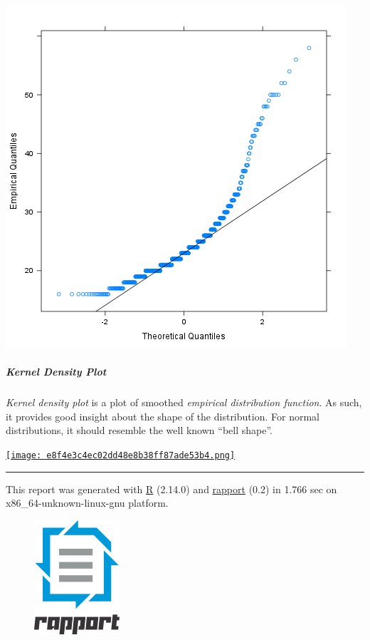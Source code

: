 \documentclass[]{article}
\makeatletter
\def\maxwidth{\ifdim\Gin@nat@width>\linewidth\linewidth
\else\Gin@nat@width\fi}
\let\Oldincludegraphics\includegraphics
\renewcommand{\includegraphics}[1]{\Oldincludegraphics[width=\maxwidth]{#1}}
\makeatother
\begin{document}
\href{131f20f388f78bd4863828d9fed8c35c-hires.png}{\includegraphics{131f20f388f78bd4863828d9fed8c35c.png}}

\subparagraph{Kernel Density Plot}

\emph{Kernel density plot} is a plot of smoothed \emph{empirical
distribution function}. As such, it provides good insight about the
shape of the distribution. For normal distributions, it should resemble
the well known ``bell shape''.

\href{e8f4e3c4ec02dd48e8b38ff87ade53b4-hires.png}{\texttt{[image: e8f4e3c4ec02dd48e8b38ff87ade53b4.png]}}

\begin{center}\rule{3in}{0.4pt}\end{center}

This report was generated with \href{http://www.r-project.org/}{R}
(2.14.0) and \href{http://al3xa.github.com/rapport/}{rapport} (0.2) in
1.766 sec on x86\_64-unknown-linux-gnu platform.

\begin{figure}[htbp]
\centering
\includegraphics{images/logo.png}
\caption{}
\end{figure}
\end{document}
